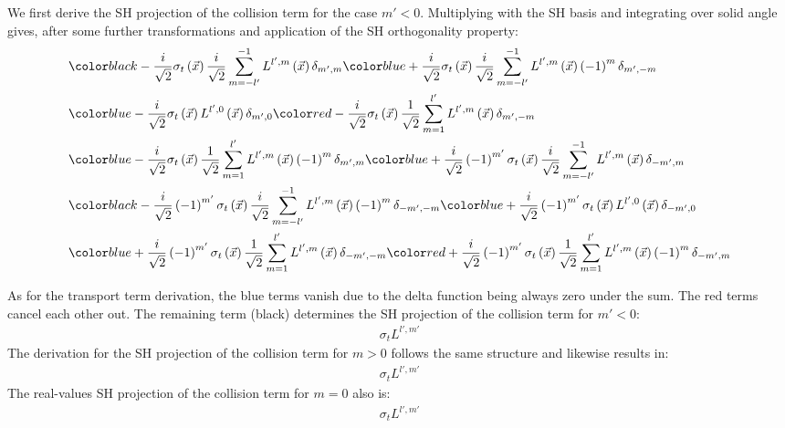 \documentclass{egpubl}
\makeatletter
\def\mathcolor#1#{\@mathcolor{#1}}
\def\@mathcolor#1#2#3{%
  \protect\leavevmode
  \begingroup\color#1{#2}#3\endgroup
}
\makeatother
\begin{document}
We first derive the SH projection of the collision term for the case $m'<0$. Multiplying with the SH basis and integrating over solid angle gives, after some further transformations and application of the SH orthogonality property:
\begin{align*}
&
\mathcolor{black}
{
-\frac{i}{\sqrt{2}}\sigma_t\left (\vec{x} \right )\frac{i}{\sqrt{2}}\sum_{m=-l'}^{-1}{L^{{l',m}}\left (\vec{x} \right )\delta_{m',m}}
}
\mathcolor{blue}
{
+\frac{i}{\sqrt{2}}\sigma_t\left (\vec{x} \right )\frac{i}{\sqrt{2}}\sum_{m=-l'}^{-1}{L^{{l',m}}\left (\vec{x} \right )\left({-1}\right)^{m}\delta_{m',-m}}
}
\\&
\mathcolor{blue}
{
-\frac{i}{\sqrt{2}}\sigma_t\left (\vec{x} \right )L^{{l',0}}\left (\vec{x} \right )\delta_{m',0}
}
\mathcolor{red}
{
-\frac{i}{\sqrt{2}}\sigma_t\left (\vec{x} \right )\frac{1}{\sqrt{2}}\sum_{m=1}^{l'}{L^{{l',m}}\left (\vec{x} \right )\delta_{m',-m}}
}
\\&
\mathcolor{blue}
{
-\frac{i}{\sqrt{2}}\sigma_t\left (\vec{x} \right )\frac{1}{\sqrt{2}}\sum_{m=1}^{l'}{L^{{l',m}}\left (\vec{x} \right )\left({-1}\right)^{m}\delta_{m',m}}
}
\mathcolor{blue}
{
+\frac{i}{\sqrt{2}}\left({-1}\right)^{m'}\sigma_t\left (\vec{x} \right )\frac{i}{\sqrt{2}}\sum_{m=-l'}^{-1}{L^{{l',m}}\left (\vec{x} \right )\delta_{-m',m}}
}
\\&
\mathcolor{black}
{
-\frac{i}{\sqrt{2}}\left({-1}\right)^{m'}\sigma_t\left (\vec{x} \right )\frac{i}{\sqrt{2}}\sum_{m=-l'}^{-1}{L^{{l',m}}\left (\vec{x} \right )\left({-1}\right)^{m}\delta_{-m',-m}}
}
\mathcolor{blue}
{
+\frac{i}{\sqrt{2}}\left({-1}\right)^{m'}\sigma_t\left (\vec{x} \right )L^{{l',0}}\left (\vec{x} \right )\delta_{-m',0}
}
\\&
\mathcolor{blue}
{
+\frac{i}{\sqrt{2}}\left({-1}\right)^{m'}\sigma_t\left (\vec{x} \right )\frac{1}{\sqrt{2}}\sum_{m=1}^{l'}{L^{{l',m}}\left (\vec{x} \right )\delta_{-m',-m}}
}
\mathcolor{red}
{
+\frac{i}{\sqrt{2}}\left({-1}\right)^{m'}\sigma_t\left (\vec{x} \right )\frac{1}{\sqrt{2}}\sum_{m=1}^{l'}{L^{{l',m}}\left (\vec{x} \right )\left({-1}\right)^{m}\delta_{-m',m}}
}
\end{align*}

As for the transport term derivation, the blue terms vanish due to the delta function being always zero under the sum. The red terms cancel each other out. The remaining term (black) determines the SH projection of the collision term for $m'<0$:
\begin{align}
\sigma_t L^{l',m'}
\end{align}
The derivation for the SH projection of the collision term for $m>0$ follows the same structure and likewise results in:
\begin{align}
\sigma_t L^{l',m'}
\end{align}
The real-values SH projection of the collision term for $m=0$ also is:
\begin{align}
\sigma_t L^{l',m'}
\end{align}
\end{document}
